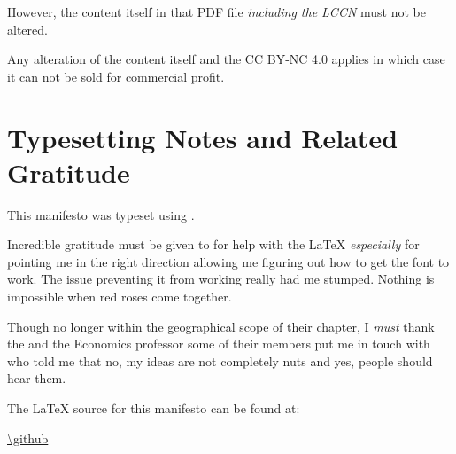 However, the content itself in that PDF file \emph{including the LCCN} must not be altered.

Any alteration of the content itself and the CC BY-NC 4.0 applies in which case it can not be sold for commercial profit.

\clearpage

\section{Typesetting Notes and Related Gratitude}

This manifesto was typeset using .

\bigskip

\noindent Incredible gratitude must be given to  for help with the \LaTeX{} \emph{especially} for pointing me in the right direction allowing me figuring out how to get the  font to work. The issue preventing it from working really had me stumped. Nothing is impossible when red roses come together.

\bigskip

\noindent Though no longer within the geographical scope of their chapter, I \emph{must} thank the  and the Economics professor some of their members put me in touch with who told me that no, my ideas are not completely nuts and yes, people should hear them.

\bigskip

\noindent The \LaTeX{} source for this manifesto can be found at:

\bigskip

\url{\github} 
